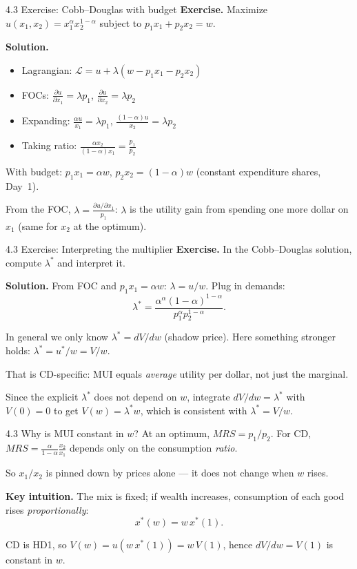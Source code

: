 \documentclass[11pt,aspectratio=169]{beamer}
\newcommand{\QFrame}[1]{\begin{frame}{#1 \quad {\small\textcolor{mAccent}{Together}}}}
\begin{document}
\QFrame{4.3 Exercise: Cobb--Douglas with budget}
  \small
  \textbf{Exercise.} Maximize $u(x_1, x_2) = x_1^\alpha x_2^{1-\alpha}$ subject to $p_1x_1 + p_2x_2 = w$.
  
  \textbf{Solution.}
  
  \begin{itemize}
    \item Lagrangian: $\mathcal{L} = u + \lambda(w - p_1x_1 - p_2x_2)$
    
    \item FOCs: $\frac{\partial u}{\partial x_1} = \lambda p_1$, $\frac{\partial u}{\partial x_2} = \lambda p_2$
    
    \item Expanding: $\frac{\alpha u}{x_1} = \lambda p_1$, $\frac{(1-\alpha)u}{x_2} = \lambda p_2$
    
    \item Taking ratio: $\frac{\alpha x_2}{(1-\alpha)x_1} = \frac{p_1}{p_2}$
  \end{itemize}
  
  With budget: $p_1x_1 = \alpha w$, $p_2x_2 = (1-\alpha)w$ (constant expenditure shares, Day~1).
  
  From the FOC, $\lambda = \frac{\partial u/\partial x_1}{p_1}$: $\lambda$ is the utility gain from spending one more dollar on $x_1$
  (same for $x_2$ at the optimum).
\end{frame}

\QFrame{4.3 Exercise: Interpreting the multiplier}
  \small
  \textbf{Exercise.} In the Cobb--Douglas solution, compute $\lambda^*$ and interpret it.
  
  \textbf{Solution.} From FOC and $p_1x_1=\alpha w$: $\lambda=u/w$. Plug in demands:
  \[
    \lambda^*=\frac{\alpha^\alpha(1-\alpha)^{1-\alpha}}{p_1^\alpha p_2^{1-\alpha}}.
  \]
  
  In general we only know $\lambda^*=dV/dw$ (shadow price). Here something stronger holds: $\lambda^*=u^*/w=V/w$.
  
  That is CD-specific: MUI equals \emph{average} utility per dollar, not just the marginal.
  
  Since the explicit $\lambda^*$ does not depend on $w$, integrate $dV/dw=\lambda^*$ with $V(0)=0$ to get $V(w)=\lambda^* w$, which is consistent with $\lambda^*=V/w$.
\end{frame}

\begin{frame}{4.3 Why is MUI constant in $w$?}
  \small
  At an optimum, $MRS=p_1/p_2$. For CD, $MRS=\frac{\alpha}{1-\alpha}\frac{x_2}{x_1}$ depends only on the consumption \emph{ratio}.
  
  So $x_1/x_2$ is pinned down by prices alone --- it does not change when $w$ rises.
  
  \textbf{Key intuition.} The mix is fixed; if wealth increases, consumption of each good rises \emph{proportionally}:
  \[
    x^*(w)=w\,x^*(1).
  \]
  
  CD is HD1, so $V(w)=u(w\,x^*(1))=w\,V(1)$, hence $dV/dw=V(1)$ is constant in $w$.
\end{frame}
\end{document}
